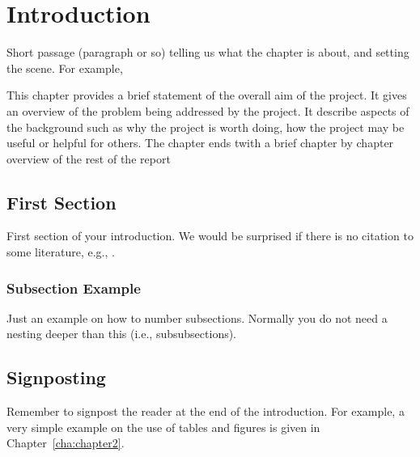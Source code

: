 \chapter{Introduction} \label{cha:intro}


Short passage (paragraph or so) telling us what the chapter is about,
and setting the scene. For example,

This chapter provides a brief statement of the overall aim of the
project. It gives an overview of the problem being addressed by the
project. It describe aspects of the background such as why the project
is worth doing, how the project may be useful or helpful for
others. The chapter ends twith a brief chapter by chapter overview of
the rest of the report

\section{First Section} \label{sec:intro:first}

First section of your introduction. We would be surprised if there is
no citation to some literature, e.g.,
\cite{lulcs,PapacchiniCaminatiHu23}.



\subsection{Subsection Example} \label{sec:intro:a_subsection}

Just an example on how to number subsections. Normally you do not need
a nesting deeper than this (i.e., subsubsections).


\section{Signposting} \label{sec:intro:signposting}
Remember to signpost the reader at the end of the introduction. For
example, a very simple example on the use of tables and figures is
given in Chapter~\ref{cha:chapter2}.

